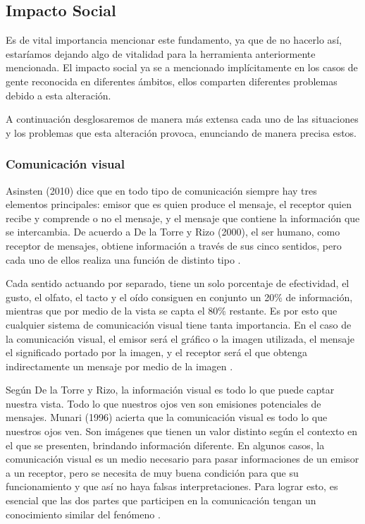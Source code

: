\documentclass[10pt]{article}
\begin{document}
\subsection{Impacto Social}
Es de vital importancia mencionar este fundamento, ya que de no hacerlo así, estaríamos dejando algo de vitalidad para la herramienta anteriormente mencionada. El impacto social ya se a mencionado implícitamente en los casos de gente reconocida en diferentes ámbitos, ellos comparten diferentes problemas debido a esta alteración.

A continuación desglosaremos de manera más extensa cada uno de las situaciones y los problemas que esta alteración provoca, enunciando de manera precisa estos.

\subsubsection{Comunicación visual}
Asinsten (2010) dice que en todo tipo de comunicación siempre hay tres elementos principales: emisor que es quien produce el mensaje, el receptor quien recibe y comprende o no el mensaje, y el mensaje que contiene la información que se intercambia. De acuerdo a De la Torre y Rizo (2000), el ser humano, como receptor de mensajes, obtiene información a través de sus cinco sentidos, pero cada uno de ellos realiza una función de distinto tipo \cite{IEEEreferencias:Ref32}.

Cada sentido actuando por separado, tiene un solo porcentaje de efectividad, el gusto, el olfato, el tacto y el oído consiguen en conjunto un 20\% de información, mientras que por medio de la vista se capta el 80\% restante. Es por esto que cualquier sistema de comunicación visual tiene tanta importancia. En el caso de la comunicación visual, el emisor será el gráfico o la imagen utilizada, el mensaje el significado portado por la imagen, y el receptor será el que obtenga indirectamente un mensaje por medio de la imagen \cite{IEEEreferencias:Ref32}.

Según De la Torre y Rizo, la información visual es todo lo que puede captar nuestra vista. Todo lo que nuestros ojos ven son emisiones potenciales de mensajes. Munari (1996) acierta que la comunicación visual es todo lo que nuestros ojos ven. Son imágenes que tienen un valor distinto según el contexto en el que se presenten, brindando información diferente. En algunos casos, la comunicación visual es un medio necesario para pasar informaciones de un emisor a un receptor, pero se necesita de muy buena condición para que su funcionamiento y que así no haya falsas interpretaciones. Para lograr esto, es esencial que las dos partes que participen en la comunicación tengan un conocimiento similar del fenómeno \cite{IEEEreferencias:Ref32}.
\end{document}
